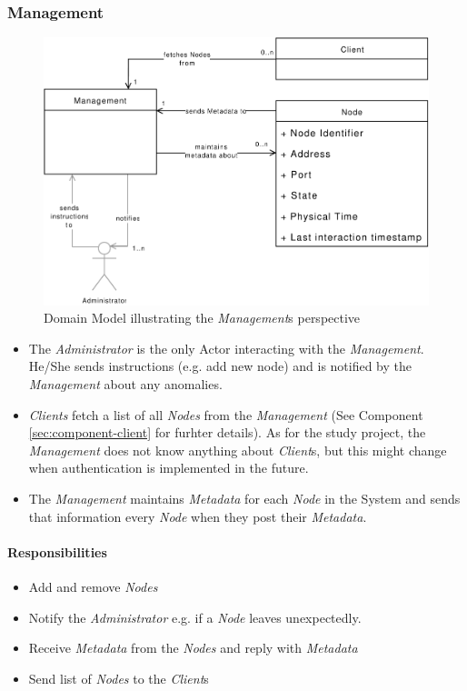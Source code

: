 \subsubsection{Management}

\begin{figure}[h]
    \centering
    \includegraphics[width=0.75\linewidth]{resources/management_domain_model}
    \caption[Management Domain Model]{Domain Model illustrating the \emph{Management}s perspective}
\end{figure}
\begin{itemize}
    \item The \emph{Administrator} is the only Actor interacting with the \emph{Management}. He/She sends instructions (e.g. add new node) and is notified by the \emph{Management} about any anomalies.
    \item \emph{Clients} fetch a list of all \emph{Nodes} from the \emph{Management} (See Component \ref{sec:component-client}  for furhter details). As for the study project, the \emph{Management} does not know anything about \emph{Client}s, but this might change when authentication is implemented in the future.
    \item The \emph{Management} maintains \emph{Metadata} for each \emph{Node} in the System and sends that information every \emph{Node} when they post their \emph{Metadata}.
\end{itemize}

\paragraph{Responsibilities}
\begin{itemize}
    \item Add and remove \emph{Nodes}
    \item Notify the \emph{Administrator} e.g. if a \emph{Node} leaves unexpectedly.
    \item Receive \emph{Metadata} from the \emph{Nodes} and reply with \emph{Metadata}
    \item Send list of \emph{Nodes} to the \emph{Client}s
\end{itemize}

